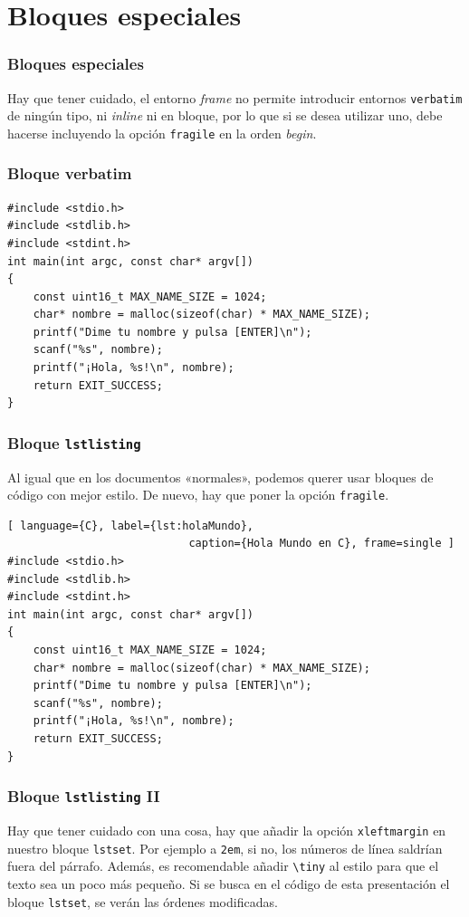 \documentclass{beamer}
\begin{document}
    \section{Bloques especiales}
    \begin{frame}
        \frametitle{Bloques especiales}
        Hay que tener cuidado, el entorno \textit{frame} no permite introducir
        entornos \texttt{verbatim} de ningún tipo, ni \textit{inline} ni en
        bloque, por lo que si se desea utilizar uno, debe hacerse incluyendo
        la opción \texttt{fragile} en la orden \textit{begin}.
    \end{frame}
    \begin{frame}[fragile]
        \frametitle{Bloque verbatim}
        \begin{verbatim}
#include <stdio.h>
#include <stdlib.h>
#include <stdint.h>
int main(int argc, const char* argv[])
{
    const uint16_t MAX_NAME_SIZE = 1024;
    char* nombre = malloc(sizeof(char) * MAX_NAME_SIZE);
    printf("Dime tu nombre y pulsa [ENTER]\n");
    scanf("%s", nombre);
    printf("¡Hola, %s!\n", nombre);
    return EXIT_SUCCESS;
}
        \end{verbatim}
    \end{frame}
    \begin{frame}
        \frametitle{Bloque \texttt{lstlisting}}
        Al igual que en los documentos «normales», podemos querer usar bloques
        de código con mejor estilo. De nuevo, hay que poner la opción
        \texttt{fragile}.
        
        \begin{lstlisting}[ language={C}, label={lst:holaMundo},
                            caption={Hola Mundo en C}, frame=single ]
#include <stdio.h>
#include <stdlib.h>
#include <stdint.h>
int main(int argc, const char* argv[])
{
    const uint16_t MAX_NAME_SIZE = 1024;
    char* nombre = malloc(sizeof(char) * MAX_NAME_SIZE);
    printf("Dime tu nombre y pulsa [ENTER]\n");
    scanf("%s", nombre);
    printf("¡Hola, %s!\n", nombre);
    return EXIT_SUCCESS;
}
        \end{lstlisting}
    \end{frame}
    \begin{frame}[fragile]
        \frametitle{Bloque \texttt{lstlisting} II}
        Hay que tener cuidado con una cosa, hay que añadir la opción
        \verb!xleftmargin! en nuestro bloque \verb!lstset!. Por ejemplo a
        \verb!2em!, si no, los números de línea saldrían fuera del párrafo.
        Además, es recomendable añadir \verb!\tiny! al estilo para que el texto
        sea un poco más pequeño. Si se busca en el código de esta presentación
        el bloque \verb!lstset!, se verán las órdenes modificadas.
    \end{frame}
\end{document}
